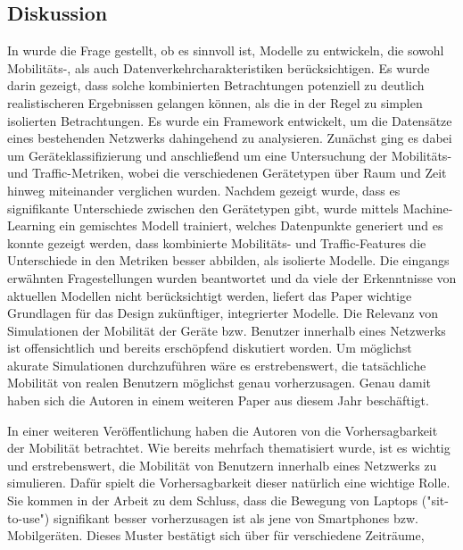 \documentclass[12pt, a4paper]{article}
\begin{document}
\subsection{Diskussion}

In \cite{Alipour2018} wurde die Frage gestellt, ob es sinnvoll ist, Modelle zu entwickeln, die sowohl
Mobilitäts-, als auch Datenverkehrcharakteristiken berücksichtigen. Es wurde darin gezeigt, dass solche
kombinierten Betrachtungen potenziell zu deutlich realistischeren Ergebnissen gelangen können,
als die in der Regel zu simplen isolierten Betrachtungen.
Es wurde ein Framework entwickelt, um die Datensätze eines bestehenden Netzwerks dahingehend zu analysieren.
Zunächst ging es dabei um Geräteklassifizierung und anschließend um eine Untersuchung der Mobilitäts-
und Traffic-Metriken, wobei die verschiedenen Gerätetypen über Raum und Zeit hinweg miteinander verglichen wurden.
Nachdem gezeigt wurde, dass es signifikante Unterschiede zwischen den Gerätetypen gibt,
wurde mittels Machine-Learning ein gemischtes Modell trainiert, welches Datenpunkte generiert
und es konnte gezeigt werden, dass kombinierte Mobilitäts- und Traffic-Features die Unterschiede in den
Metriken besser abbilden, als isolierte Modelle. Die eingangs erwähnten Fragestellungen wurden beantwortet
und da viele der Erkenntnisse von aktuellen Modellen nicht berücksichtigt werden, liefert
das Paper wichtige Grundlagen für das Design zukünftiger, integrierter Modelle.
\newline\newline
Die Relevanz von Simulationen der Mobilität der Geräte bzw. Benutzer innerhalb eines Netzwerks
ist offensichtlich und bereits erschöpfend diskutiert worden. Um möglichst akurate Simulationen
durchzuführen wäre es erstrebenswert, die tatsächliche Mobilität von realen Benutzern möglichst genau
vorherzusagen. Genau damit haben sich die Autoren in einem weiteren Paper aus diesem Jahr beschäftigt.


In einer weiteren Veröffentlichung haben die Autoren von \cite{Alipour2018} die Vorhersagbarkeit
der Mobilität betrachtet. Wie bereits mehrfach thematisiert wurde, ist es wichtig und erstrebenswert,
die Mobilität von Benutzern innerhalb eines Netzwerks zu simulieren. Dafür spielt die Vorhersagbarkeit
dieser natürlich eine wichtige Rolle. Sie kommen in der Arbeit zu dem Schluss, dass
die Bewegung von Laptops ("sit-to-use") signifikant besser vorherzusagen ist als jene
von Smartphones bzw. Mobilgeräten.
Dieses Muster bestätigt sich über für verschiedene Zeiträume,
\end{document}
